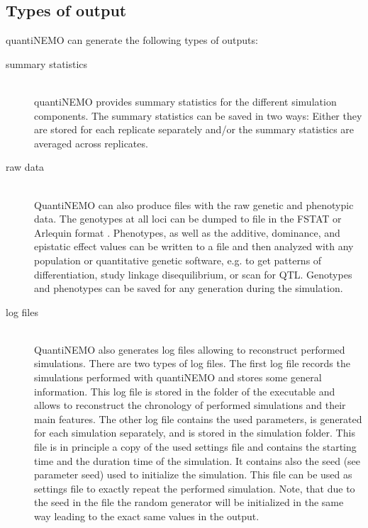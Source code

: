 \documentclass[letterpaper,12pt,oneside]{book}
\begin{document}
\subsection[Types]{Types of output}
quantiNEMO can generate the following types of outputs:
\begin{description}
\item[summary statistics]\hspace*{\fill}\\
quantiNEMO provides summary statistics for the different simulation components. The summary statistics can be saved in two ways: Either they are stored for each replicate separately and/or the summary statistics are averaged across replicates.  

\item[raw data]\hspace*{\fill}\\
QuantiNEMO can also produce files with the raw genetic and phenotypic data. The genotypes at all loci can be dumped to file in the FSTAT  \citep{Goudet_1995} or Arlequin format \citep{Excoffier_2010}. Phenotypes, as well as the additive, dominance, and epistatic effect values can be written to a file and then analyzed with any population or quantitative genetic software, e.g. to get patterns of differentiation, study linkage disequilibrium, or scan for QTL. Genotypes and phenotypes can be saved for any generation during the simulation.

\item[log files]\hspace*{\fill}\\
QuantiNEMO also generates log files allowing to reconstruct performed simulations. There are two types of log files. The first log file records the simulations performed with quantiNEMO and stores some general information. This log file is stored in the folder of the executable and allows to reconstruct the chronology of performed simulations and their main features. The other log file contains the used parameters, is generated for each simulation separately, and is stored in the simulation folder. This file is in principle a copy of the used settings file and contains the starting time and the duration time of the simulation. It contains also the seed (see parameter \textsf{seed}) used to initialize the simulation. This file can be used as settings file to exactly repeat the performed simulation. Note, that due to the seed in the file the random generator will be initialized in the same way leading to the exact same values in the output.
\end{description}
\end{document}
